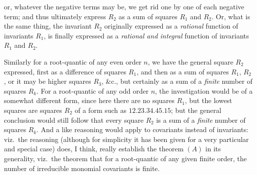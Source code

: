\documentclass[11pt,a4paper,english]{article}
\theoremstyle{plain}
\begin{document}
or, whatever the negative terms may be, we get rid one by one of each negative term; and thus ultimately express $R_2$ as a sum of squares $R_1$ and $R_2$. Or, what is the same thing, the invariant $R_2$ originally expressed as a \textit{rational} function of invariants $R_1$, is finally expressed as a \textit{rational and integral} function of invariants $R_1$ and $R_2$.

Similarly for a root-quantic of any even order $n$, we have the general square $R_2$ expressed, first as a difference of squares $R_1$, and then as a sum of squares $R_1$, $R_2$, or it may be higher squares $R_3$, \&c., but certainly as a sum of a \textit{finite} number of squares $R_k$. For a root-quantic of any odd order $n$, the investigation would be of a somewhat different form, since here there are no squares $R_1$, but the lowest squares are squares $R_2$ of a form such as $12.23.34.45.15$; but the general conclusion would still follow that every square $R_2$ is a sum of a \textit{finite} number of squares $R_k$. And a like reasoning would apply to covariants instead of invariants: viz.\ the reasoning (although for simplicity it has been given for a very particular and special case) does, I think, really establish the theorem $(A)$ in its generality, viz.\ the theorem that for a root-quantic of any given finite order, the number of irreducible monomial covariants is finite.
\end{document}
